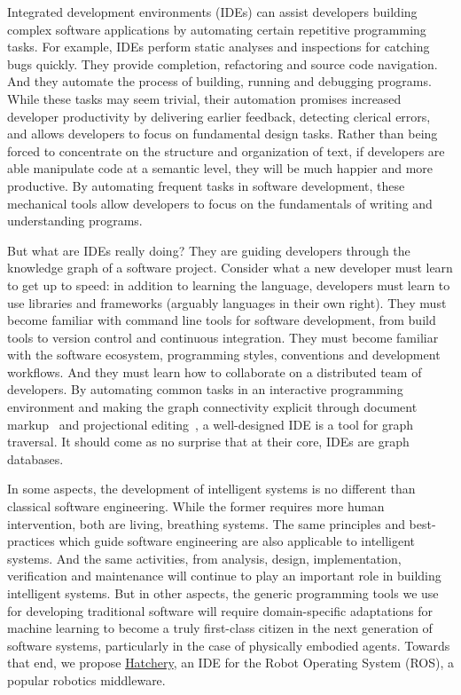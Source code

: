 \documentclass[12pt,initial,twoside,maitrise]{dms}
\numberwithin{equation}{section}
\numberwithin{table}{chapter}
\numberwithin{figure}{chapter}
\begin{document}
Integrated development environments (IDEs) can assist developers building complex software applications by automating certain repetitive programming tasks. For example, IDEs perform static analyses and inspections for catching bugs quickly. They provide completion, refactoring and source code navigation. And they automate the process of building, running and debugging programs. While these tasks may seem trivial, their automation promises increased developer productivity by delivering earlier feedback, detecting clerical errors, and allows developers to focus on fundamental design tasks. Rather than being forced to concentrate on the structure and organization of text, if developers are able manipulate code at a semantic level, they will be much happier and more productive. By automating frequent tasks in software development, these mechanical tools allow developers to focus on the fundamentals of writing and understanding programs.

But what are IDEs really doing? They are guiding developers through the knowledge graph of a software project. Consider what a new developer must learn to get up to speed: in addition to learning the language, developers must learn to use libraries and frameworks (arguably languages in their own right). They must become familiar with command line tools for software development, from build tools to version control and continuous integration. They must become familiar with the software ecosystem, programming styles, conventions and development workflows. And they must learn how to collaborate on a distributed team of developers. By automating common tasks in an interactive programming environment and making the graph connectivity explicit through document markup~\cite{goldfarb1981generalized} and projectional editing~\cite{voelter2014towards}, a well-designed IDE is a tool for graph traversal. It should come as no surprise that at their core, IDEs are graph databases.

In some aspects, the development of intelligent systems is no different than classical software engineering. While the former requires more human intervention, both are living, breathing systems. The same principles and best-practices which guide software engineering are also applicable to intelligent systems. And the same activities, from analysis, design, implementation, verification and maintenance will continue to play an important role in building intelligent systems. But in other aspects, the generic programming tools we use for developing traditional software will require domain-specific adaptations for machine learning to become a truly first-class citizen in the next generation of software systems, particularly in the case of physically embodied agents. Towards that end, we propose \href{https://github.com/duckietown/hatchery}{Hatchery}, an IDE for the Robot Operating System (ROS), a popular robotics middleware.
\end{document}
